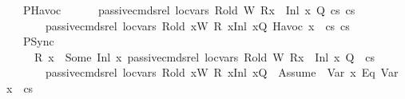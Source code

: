 \begin{isabellebody}
\ \ {\isacharbar}{\kern0pt}\ PHavoc{\isacharcolon}{\kern0pt}\ \isanewline
\ \ \ \ {\isachardoublequoteopen}{\isasymlbrakk}\ passive{\isacharunderscore}{\kern0pt}cmds{\isacharunderscore}{\kern0pt}rel\ loc{\isacharunderscore}{\kern0pt}vars\ R{\isacharunderscore}{\kern0pt}old\ W\ {\isacharparenleft}{\kern0pt}R{\isacharparenleft}{\kern0pt}x\ {\isasymmapsto}\ {\isacharparenleft}{\kern0pt}Inl\ x{\isacharprime}{\kern0pt}{\isacharparenright}{\kern0pt}{\isacharparenright}{\kern0pt}{\isacharparenright}{\kern0pt}\ Q\ cs{}\ cs{}{\isasymrbrakk}\ {\isasymLongrightarrow}\ \isanewline
\ \ \ \ \ \ \ passive{\isacharunderscore}{\kern0pt}cmds{\isacharunderscore}{\kern0pt}rel\ loc{\isacharunderscore}{\kern0pt}vars\ R{\isacharunderscore}{\kern0pt}old\ {\isacharparenleft}{\kern0pt}x{\isacharprime}{\kern0pt}{\isacharhash}{\kern0pt}W{\isacharparenright}{\kern0pt}\ R\ {\isacharparenleft}{\kern0pt}{\isacharparenleft}{\kern0pt}x{\isacharcomma}{\kern0pt}{\isacharparenleft}{\kern0pt}Inl\ x{\isacharprime}{\kern0pt}{\isacharparenright}{\kern0pt}{\isacharparenright}{\kern0pt}{\isacharhash}{\kern0pt}Q{\isacharparenright}{\kern0pt}\ {\isacharparenleft}{\kern0pt}{\isacharparenleft}{\kern0pt}Havoc\ x{\isacharparenright}{\kern0pt}\ {\isacharhash}{\kern0pt}\ cs{}{\isacharparenright}{\kern0pt}\ cs{}{\isachardoublequoteclose}\ \ \isanewline
\ \ {\isacharbar}{\kern0pt}\ PSync{\isacharcolon}{\kern0pt}\ \ \ \ \ \ \ \isanewline
\ \ \ \ {\isachardoublequoteopen}{\isasymlbrakk}\ R\ x\ {\isacharequal}{\kern0pt}\ Some\ {\isacharparenleft}{\kern0pt}Inl\ x{}{\isacharparenright}{\kern0pt}{\isacharsemicolon}{\kern0pt}\ passive{\isacharunderscore}{\kern0pt}cmds{\isacharunderscore}{\kern0pt}rel\ loc{\isacharunderscore}{\kern0pt}vars\ R{\isacharunderscore}{\kern0pt}old\ W\ {\isacharparenleft}{\kern0pt}R{\isacharparenleft}{\kern0pt}x\ {\isasymmapsto}\ {\isacharparenleft}{\kern0pt}Inl\ x{}{\isacharparenright}{\kern0pt}{\isacharparenright}{\kern0pt}{\isacharparenright}{\kern0pt}\ Q\ {\isacharbrackleft}{\kern0pt}{\isacharbrackright}{\kern0pt}\ cs\ {\isasymrbrakk}\ {\isasymLongrightarrow}\isanewline
\ \ \ \ \ \ \ passive{\isacharunderscore}{\kern0pt}cmds{\isacharunderscore}{\kern0pt}rel\ loc{\isacharunderscore}{\kern0pt}vars\ R{\isacharunderscore}{\kern0pt}old\ {\isacharparenleft}{\kern0pt}x{}{\isacharhash}{\kern0pt}W{\isacharparenright}{\kern0pt}\ R\ {\isacharparenleft}{\kern0pt}{\isacharparenleft}{\kern0pt}x{\isacharcomma}{\kern0pt}{\isacharparenleft}{\kern0pt}Inl\ x{}{\isacharparenright}{\kern0pt}{\isacharparenright}{\kern0pt}{\isacharhash}{\kern0pt}Q{\isacharparenright}{\kern0pt}\ {\isacharbrackleft}{\kern0pt}{\isacharbrackright}{\kern0pt}\ {\isacharparenleft}{\kern0pt}{\isacharparenleft}{\kern0pt}Assume\ {\isacharparenleft}{\kern0pt}\ {\isacharparenleft}{\kern0pt}Var\ x{}{\isacharparenright}{\kern0pt}\ {\isasymguillemotleft}Eq{\isasymguillemotright}\ {\isacharparenleft}{\kern0pt}Var\ x{}{\isacharparenright}{\kern0pt}{\isacharparenright}{\kern0pt}{\isacharparenright}{\kern0pt}\ {\isacharhash}{\kern0pt}\ cs{\isacharparenright}{\kern0pt}{\isachardoublequoteclose}\isanewline

\end{isabellebody}
